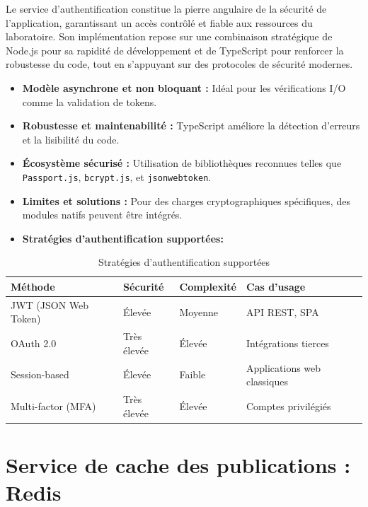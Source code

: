 \documentclass{rapportPfe}
\begin{document}
Le service d'authentification constitue la pierre angulaire de la sécurité de l'application, garantissant un accès contrôlé et fiable aux ressources du laboratoire. Son implémentation repose sur une combinaison stratégique de Node.js pour sa rapidité de développement et de TypeScript pour renforcer la robustesse du code, tout en s'appuyant sur des protocoles de sécurité modernes.

\begin{itemize}
    \item \textbf{Modèle asynchrone et non bloquant :} Idéal pour les vérifications I/O comme la validation de tokens.
    \item \textbf{Robustesse et maintenabilité :} TypeScript améliore la détection d’erreurs et la lisibilité du code.
    \item \textbf{Écosystème sécurisé :} Utilisation de bibliothèques reconnues telles que \texttt{Passport.js}, \texttt{bcrypt.js}, et \texttt{jsonwebtoken}.
    \item \textbf{Limites et solutions :} Pour des charges cryptographiques spécifiques, des modules natifs peuvent être intégrés.
    \item \textbf{Stratégies d'authentification supportées:}
\end{itemize}

\begin{table}[ht]
\centering
\begin{tabular}{| >{\raggedright\arraybackslash}p{4cm} 
                | >{\raggedright\arraybackslash}p{3cm} 
                | >{\raggedright\arraybackslash}p{3cm} 
                | >{\raggedright\arraybackslash}p{5cm} |}
\hline
\textbf{Méthode} & \textbf{Sécurité} & \textbf{Complexité} & \textbf{Cas d'usage} \\
\hline
JWT (JSON Web Token) & Élevée & Moyenne & API REST, SPA \\
\hline
OAuth 2.0 & Très élevée & Élevée & Intégrations tierces \\
\hline
Session-based & Élevée & Faible & Applications web classiques \\
\hline
Multi-factor (MFA) & Très élevée & Élevée & Comptes privilégiés \\
\hline
\end{tabular}
\caption{Stratégies d'authentification supportées}
\label{tab:auth-aupported}
\end{table}

\section{Service de cache des publications : Redis}
\end{document}
